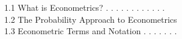 1.1 What is Econometrics? . . . . . . . . . . . .\\
1.2 The Probability Approach to Econometrics\\
1.3 Econometric Terms and Notation . . . . . . .